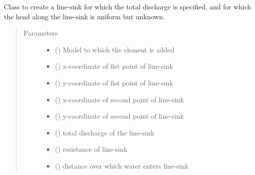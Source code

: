 \documentclass[letterpaper,10pt,english]{sphinxmanual}
\begin{document}
\begin{fulllineitems}
\label{\detokenize{linesinks/linesinkditch:timml.linesink.LineSinkDitch}}
Class to create a line-sink for which the total discharge
is specified, and for which the head along the line-sink
is uniform but unknown.
\begin{quote}\begin{description}
\item[{Parameters}] \leavevmode\begin{itemize}
\item {} 
 () \textendash{} Model to which the element is added

\item {} 
 () \textendash{} x-coordinate of fist point of line-sink

\item {} 
 () \textendash{} y-coordinate of fist point of line-sink

\item {} 
 () \textendash{} x-coordinate of second point of line-sink

\item {} 
 () \textendash{} y-coordinate of second point of line-sink

\item {} 
 () \textendash{} total discharge of the line-sink

\item {} 
 (\sphinxstyleliteralemphasis{ (}\sphinxstyleliteralemphasis{)}) \textendash{} resistance of line-sink

\item {} 
 () \textendash{} distance over which water enters line-sink


\end{itemize}
\end{description}
\end{quote}
\end{fulllineitems}
\end{document}
